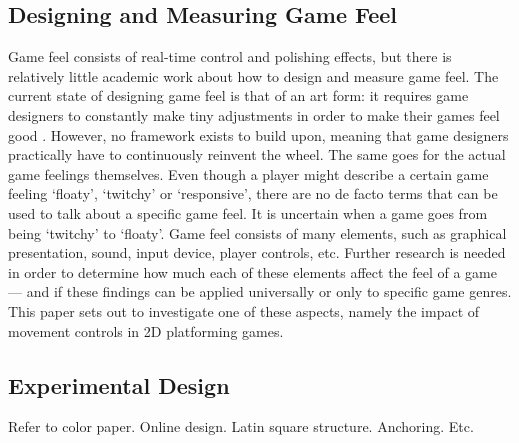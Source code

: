 
\subsection{Designing and Measuring Game Feel}
Game feel consists of real-time control and polishing effects, but there is relatively little academic work about how to design and measure game feel. The current state of designing game feel is that of an art form: it requires game designers to constantly make tiny adjustments in order to make their games feel good \cite{meatboy1, meatboy2, juicyBeast, gameFeelTips}. However, no framework exists to build upon, meaning that game designers practically have to continuously reinvent the wheel. The same goes for the actual game feelings themselves. Even though a player might describe a certain game feeling `floaty', `twitchy' or `responsive', there are no de facto terms that can be used to talk about a specific game feel. It is uncertain when a game goes from being `twitchy' to `floaty'. Game feel consists of many elements, such as graphical presentation, sound, input device, player controls, etc. Further research is needed in order to determine how much each of these elements affect the feel of a game --- and if these findings can be applied universally or only to specific game genres. This paper sets out to investigate one of these aspects, namely the impact of movement controls in 2D platforming games.

\subsection{Experimental Design}
Refer to color paper. Online design. Latin square structure. Anchoring. Etc.

